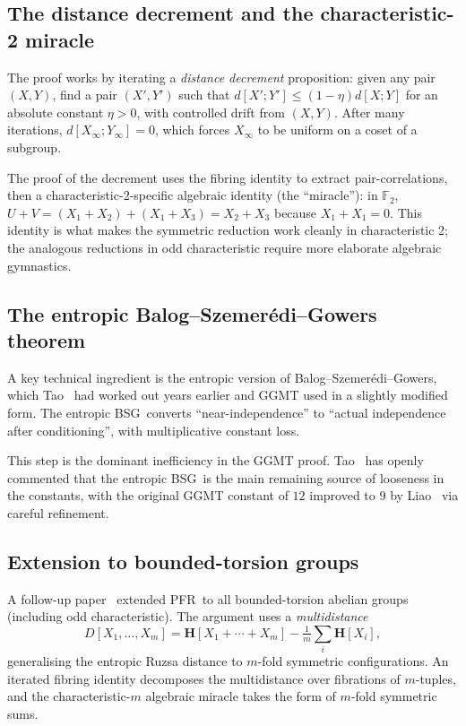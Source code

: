 \documentclass[11pt,a4paper]{article}
\theoremstyle{plain}
\theoremstyle{definition}
\theoremstyle{remark}
\newcommand{\F}{\mathbb{F}}
\newcommand{\entropy}{\mathbf{H}}
\newcommand{\dist}{d}
\newcommand{\PFR}{\textsf{PFR}}
\newcommand{\BSG}{\textsf{BSG}}
\begin{document}
\subsection{The distance decrement and the characteristic-2 miracle}

The proof works by iterating a \emph{distance decrement} proposition: given any pair $(X, Y)$, find a pair $(X', Y')$ such that $\dist[X'; Y'] \leq (1 - \eta) \dist[X; Y]$ for an absolute constant $\eta > 0$, with controlled drift from $(X, Y)$. After many iterations, $\dist[X_\infty; Y_\infty] = 0$, which forces $X_\infty$ to be uniform on a coset of a subgroup.

The proof of the decrement uses the fibring identity to extract pair-correlations, then a characteristic-2-specific algebraic identity (the ``miracle''): in $\F_2$, $U + V = (X_1 + X_2) + (X_1 + X_3) = X_2 + X_3$ because $X_1 + X_1 = 0$. This identity is what makes the symmetric reduction work cleanly in characteristic 2; the analogous reductions in odd characteristic require more elaborate algebraic gymnastics.

\subsection{The entropic Balog--Szemer\'edi--Gowers theorem}

A key technical ingredient is the entropic version of Balog--Szemer\'edi--Gowers, which Tao~\cite{tao2010} had worked out years earlier and GGMT used in a slightly modified form. The entropic \BSG\ converts ``near-independence'' to ``actual independence after conditioning'', with multiplicative constant loss.

This step is the dominant inefficiency in the GGMT proof. Tao~\cite{tao2024abridged} has openly commented that the entropic \BSG\ is the main remaining source of looseness in the constants, with the original GGMT constant of $12$ improved to $9$ by Liao~\cite{liao2024} via careful refinement.

\subsection{Extension to bounded-torsion groups}

A follow-up paper~\cite{ggmt2024} extended \PFR\ to all bounded-torsion abelian groups (including odd characteristic). The argument uses a \emph{multidistance}
\[
D[X_1, \ldots, X_m] = \entropy[X_1 + \cdots + X_m] - \tfrac{1}{m}\sum_i \entropy[X_i],
\]
generalising the entropic Ruzsa distance to $m$-fold symmetric configurations. An iterated fibring identity decomposes the multidistance over fibrations of $m$-tuples, and the characteristic-$m$ algebraic miracle takes the form of $m$-fold symmetric sums.
\end{document}
